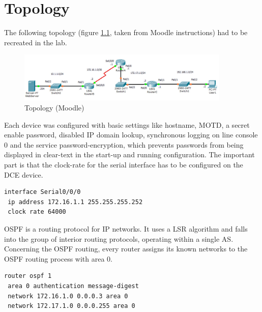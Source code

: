 \chapter{Topology}

\thispagestyle{standard}
\pagestyle{standard}

The following topology (figure \ref{img:topo}, taken from Moodle instructions) had to be recreated in the lab.

\begin{figure}[H]
	\centering
	\includegraphics[width=0.9\textwidth]{img/topo.png}
	\caption{Topology (Moodle)}
	\label{img:topo}
\end{figure}

Each device was configured with basic settings like hostname, \ac{MOTD}, a secret enable password, disabled IP domain lookup, synchronous logging on line console 0 and the service password-encryption, which prevents passwords from being displayed in clear-text in the start-up and running configuration. The important part is that the clock-rate for the serial interface has to be configured on the \ac{DCE} device.

\begin{lstlisting}[caption={Configuring IP and clock-rate for Router A},label={lst:clockrate},language={}]
interface Serial0/0/0
 ip address 172.16.1.1 255.255.255.252
 clock rate 64000
\end{lstlisting}

\ac{OSPF} is a routing protocol for \ac{IP} networks. It uses a \ac{LSR} algorithm and falls into the group of interior routing protocols, operating within a single \ac{AS}.
Concerning the \ac{OSPF} routing, every router assigns its known networks to the \ac{OSPF} routing process with area 0.
\newpage
{}%
\begin{lstlisting}[caption={\ac{OSPF} routing example router A},label={lst:ospf},language={}]
router ospf 1
 area 0 authentication message-digest
 network 172.16.1.0 0.0.0.3 area 0
 network 172.17.1.0 0.0.0.255 area 0
\end{lstlisting}

